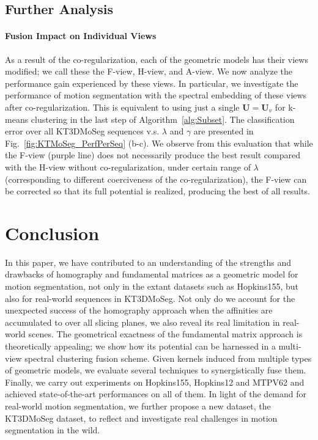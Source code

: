 \documentclass[10pt,twocolumn,letterpaper]{article}
\newcommand{\matr}[1]{\mathbf{#1}}
\begin{document}
\subsection{Further Analysis}

\paragraph{Fusion Impact on Individual Views} As a result of the co-regularization, each of the geometric models has their views modified; we call these the F-view, H-view, and A-view. We now analyze the performance gain experienced by these views. In particular, we investigate the performance of motion segmentation with the spectral embedding of these views after co-regularization. This is equivalent to using just a single $\matr{U}=\matr{U}_v$ for k-means clustering in the last step of Algorithm~\ref{alg:Subset}. The classification error over all KT3DMoSeg sequences v.s. $\lambda$ and $\gamma$ are presented in Fig.~\ref{fig:KTMoSeg_PerfPerSeq} (b-c). We observe from this evaluation that while the F-view (purple line) does not necessarily produce the best result compared with the H-view without co-regularization, under certain range of $\lambda$ (corresponding to different coerciveness of the co-regularization), the F-view can be corrected so that its full potential is realized, producing the best of all results. 









\vspace{-0.2cm}
\section{Conclusion}
In this paper, we have contributed to an understanding of the strengths and drawbacks of homography and fundamental matrices as a geometric model for motion segmentation, not only in the extant datasets such as Hopkins155, but also for real-world sequences in KT3DMoSeg. Not only do we account for the unexpected success of the homography approach when the affinities are accumulated to over all slicing planes, we also reveal its real limitation in real-world scenes. The geometrical exactness of the fundamental matrix approach is theoretically appealing; we show how its potential can be harnessed in a multi-view spectral clustering fusion scheme. Given kernels induced from multiple types of geometric models, we evaluate several techniques to synergistically fuse them. Finally, we carry out experiments on Hopkins155, Hopkins12  and MTPV62 and achieved state-of-the-art performances on all of them. In light of the demand for real-world motion segmentation, we further propose a new dataset, the KT3DMoSeg dataset, to reflect and investigate real challenges in motion segmentation in the wild.




{\small


}
\end{document}
